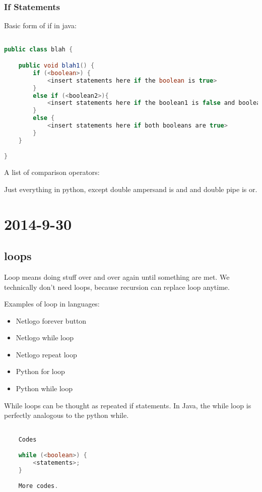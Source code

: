 \documentclass [12 pt, twoside] {article}
\begin{document}
\subsubsection{If Statements}


Basic form of if in java:
\begin{lstlisting}[language = Java]

public class blah {

	public void blah1() {
		if (<boolean>) {
			<insert statements here if the boolean is true>
		}
		else if (<boolean2>){
			<insert statements here if the boolean1 is false and boolean2 is true>
		}
		else {
			<insert statements here if both booleans are true>
		}
	}

}

\end{lstlisting}


A list of comparison operators:


Just everything in python, except double ampersand is and and double pipe is or.


\section{2014-9-30}
\subsection{loops}


Loop means doing stuff over and over again until something are met.
We technically don't need loops, because recursion can replace loop anytime.


Examples of loop in languages:
\begin{itemize}
	\item Netlogo forever button
	\item Netlogo while loop
	\item Netlogo repeat loop
	\item Python for loop
	\item Python while loop
\end{itemize}


While loops can be thought as repeated if statements.
In Java, the while loop is perfectly analogous to the python while.
\begin{lstlisting}[language=java]

	Codes

	while (<boolean>) {
		<statements>;
	}

	More codes.

\end{lstlisting}
\end{document}

